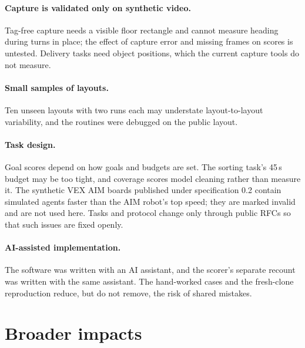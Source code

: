 \documentclass[11pt]{article}
\begin{document}
\paragraph{Capture is validated only on synthetic video.} Tag-free capture needs a visible floor
rectangle and cannot measure heading during turns in place; the effect of capture error and missing
frames on scores is untested. Delivery tasks need object positions, which the current capture tools do
not measure.

\paragraph{Small samples of layouts.} Ten unseen layouts with two runs each may understate
layout-to-layout variability, and the routines were debugged on the public layout.

\paragraph{Task design.} Goal scores depend on how goals and budgets are set. The sorting task's 45\,s
budget may be too tight, and coverage scores model cleaning rather than measure it. The synthetic VEX
AIM boards published under specification 0.2 contain simulated agents faster than the AIM robot's top
speed; they are marked invalid and are not used here. Tasks and protocol change only through public
RFCs so that such issues are fixed openly.

\paragraph{AI-assisted implementation.} The software was written with an AI assistant, and the
scorer's separate recount was written with the same assistant. The hand-worked cases and the fresh-clone
reproduction reduce, but do not remove, the risk of shared mistakes.

\section{Broader impacts}\label{sec:impacts}
\end{document}
